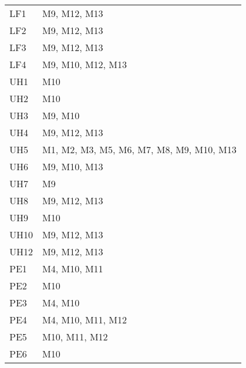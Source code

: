 \documentclass[12pt, titlepage]{article}
\begin{document}
\begin{table}[H]
\begin{tabular}{p{} p{}}
LF1 & M9, M12, M13\\
LF2 & M9, M12, M13\\
LF3 & M9, M12, M13\\
LF4 & M9, M10, M12, M13\\
UH1 & M10\\
UH2 & M10\\
UH3 & M9, M10\\
UH4 & M9, M12, M13\\
UH5 &  M1, M2, M3, M5, M6, M7, M8, M9, M10, M13 \\
UH6 & M9, M10, M13\\
UH7 & M9\\
UH8 & M9, M12, M13\\
UH9 & M10\\
UH10 & M9, M12, M13\\
UH12 & M9, M12, M13\\
PE1 & M4, M10, M11\\
PE2 & M10\\
PE3 & M4, M10\\
PE4 & M4, M10, M11, M12\\
PE5 & M10, M11, M12\\
PE6 & M10\\
\bottomrule
\end{tabular}
\end{table}
\end{document}
